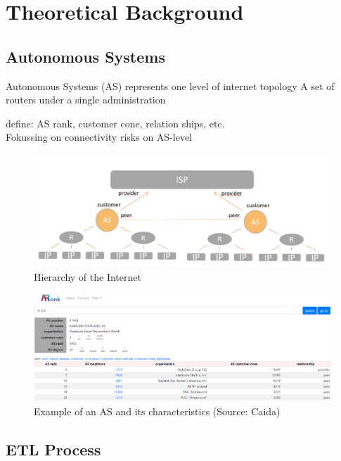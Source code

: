 \documentclass[conference]{IEEEtran}
\begin{document}
\section{Theoretical Background}
\subsection{Autonomous Systems}

Autonomous Systems (AS) represents one level of internet topology
A set of routers under a single administration

define: AS rank, customer cone, relation ships, etc. \\


Fokussing on connectivity risks on AS-level 






\begin{figure}[htbp]
\centerline{\includegraphics[scale=0.25]{Graphics/hierarchy.PNG}}
\caption{Hierarchy of the Internet}
\label{fig}
\end{figure}

\begin{figure}[htbp]
\centerline{\includegraphics[scale=0.15]{Graphics/asExample.PNG}}
\caption{Example of an AS and its characteristics (Source: Caida)}
\label{fig}
\end{figure}



\subsection{ETL Process}
\end{document}
